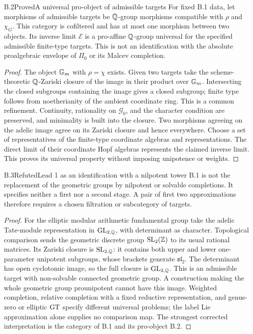 \begin{statement}{B.2}{Proved}{A universal pro-object of admissible targets}
For fixed B.1 data, let morphisms of admissible targets be
$\mathbb Q$-group morphisms compatible with $\rho$ and $\chi_G$.
This category is cofiltered and has at most one morphism between
two objects. Its inverse limit $\mathscr E$ is a pro-affine
$\mathbb Q$-group universal for the specified admissible finite-type
targets. This is not an identification with the absolute
proalgebraic envelope of $\Pi_0$ or its Malcev completion.
\end{statement}
\begin{proof}
The object $\mathbb G_m$ with $\rho=\chi$ exists. Given two targets take
the scheme-theoretic $\mathbb Q$-Zariski closure of the image in their
product over $\mathbb G_m$. Intersecting the closed subgroups containing
the image gives a closed subgroup; finite type follows from
noetherianity of the ambient coordinate ring. This is a common
refinement. Continuity, rationality on $\mathcal G_0$, and the
character condition are preserved, and minimality is built into
the closure. Two morphisms agreeing on the adelic image agree on
its Zariski closure and hence everywhere. Choose a set of
representatives of the finite-type coordinate algebras and
representations. The direct limit of their coordinate Hopf
algebras represents the claimed inverse limit. This proves its
universal property without imposing unipotence or weights.
\end{proof}

\begin{statement}{B.3}{Refuted}{Lead 1 as an identification with a nilpotent tower}
B.1 is not the replacement of the geometric groups by nilpotent
or solvable completions. It specifies neither a first nor a second
stage. A pair of first two approximations therefore requires a
chosen filtration or subcategory of targets.
\end{statement}
\begin{proof}
For the elliptic modular arithmetic fundamental group take the
adelic Tate-module representation in $\operatorname{GL}_{2,\mathbb Q}$, with determinant
as character. Topological comparison sends the geometric discrete
group $\operatorname{SL}_2(\mathbb Z)$ to its usual rational matrices. Its Zariski
closure is $\operatorname{SL}_{2,\mathbb Q}$: it contains both upper and lower
one-parameter unipotent subgroups, whose brackets generate
$\mathfrak{sl}_2$. The determinant has open cyclotomic image,
so the full closure is $\operatorname{GL}_{2,\mathbb Q}$. This is an admissible target
with non-solvable connected geometric group. A construction
making the whole geometric group prounipotent cannot have this
image. Weighted completion, relative completion with a fixed
reductive representation, and genus-zero or elliptic $\mathrm{GT}$
specify different universal problems; the label Lie approximation
alone supplies no comparison map. The strongest corrected
interpretation is the category of B.1 and its pro-object B.2.
\end{proof}

